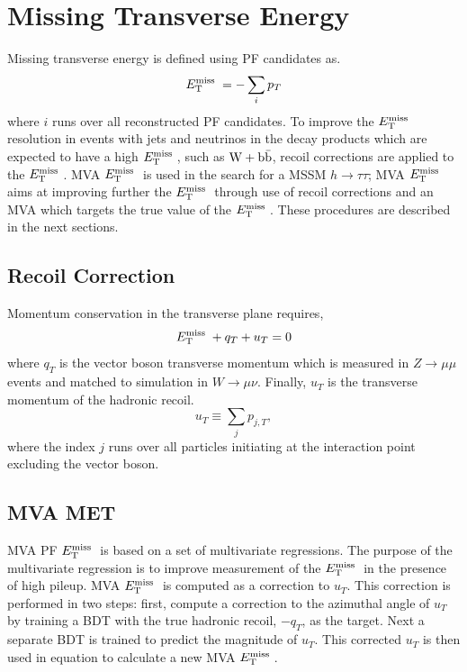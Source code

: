 \section{Missing Transverse Energy}
Missing transverse energy is defined using PF candidates as.
\begin{equation}%
\MET = -\sum_{i} p_{T}
\end{equation}
where $i$ runs over all reconstructed PF candidates. 
To improve the $E_\mathrm{T}^{\mathrm{miss}}\;$ resolution in 
events with jets and neutrinos in the decay products 
which are expected to have a high $E_\mathrm{T}^{\mathrm{miss}}\;$, such as $\mathrm{W+\mathrm{b\bar{b}}}$,
recoil corrections are applied to the $E_\mathrm{T}^{\mathrm{miss}}\;$. MVA 
$E_\mathrm{T}^{\mathrm{miss}}\;$ is used in the search for a MSSM $h\rightarrow\tau\tau$;
MVA $E_\mathrm{T}^{\mathrm{miss}}\;$ aims at improving further the $E_\mathrm{T}^{\mathrm{miss}}\;$
through use of recoil corrections and an MVA which targets the true value of the $E_\mathrm{T}^{\mathrm{miss}}\;$.
These procedures are described in the next sections.
\subsection{Recoil Correction}
Momentum conservation in the transverse plane requires,
\begin{equation}
E_\mathrm{T}^{\mathrm{miss}}\;+q_{T}+u_{T}=0
\end{equation}
where $q_{T}$ is the vector boson transverse momentum which is measured
in $Z\rightarrow\mu\mu$ events and matched to simulation in $W\rightarrow\mu\nu$.
Finally, $u_{T}$ is the transverse momentum of the hadronic recoil.
\begin{equation}
u_{T}\equiv\sum_{j} p_{j,T},
\end{equation}
where the index $j$ runs over all particles initiating at the interaction point excluding
the vector boson. 

\subsection{MVA MET}
MVA PF $E_\mathrm{T}^{\mathrm{miss}}\;$ is based on a set of multivariate regressions.
The purpose of the multivariate regression is to improve measurement of the $E_\mathrm{T}^{\mathrm{miss}}\;$
in the presence of high pileup.
MVA $E_\mathrm{T}^{\mathrm{miss}}\;$ is computed as a correction to $u_{T}$. This correction
is performed in two steps: %
first, compute a correction to the azimuthal angle
of $u_{T}$ by training a BDT with the true hadronic recoil, $-q_{T}$, as the target. Next
 a separate BDT is trained to predict the magnitude of $u_{T}$. This corrected
 $u_{T}$ is then used in equation %
 to calculate a new MVA $E_\mathrm{T}^{\mathrm{miss}}\;$. %

